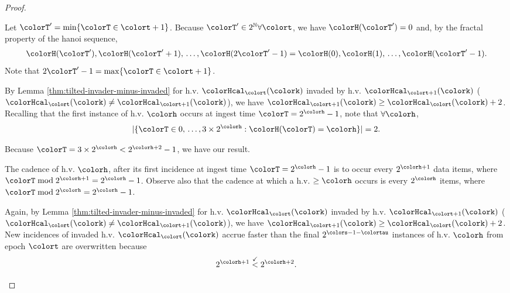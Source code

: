 \begin{proof}
\begin{proofpart}
Let $\colorT' = \min\{\colorT \in \colort + 1\}$.
Because $\colorT' \in 2^{\mathbb{N}} \forall \colort$, we have $\colorH(\colorT') = 0$ and, by the fractal property of the hanoi sequence,
\begin{align*}
\colorH(\colorT'), \colorH(\colorT'+1), \,\ldots, \colorH(2\colorT' - 1) = \colorH(0), \colorH(1), \,\ldots, \colorH(\colorT' - 1).
\end{align*}
Note that $2\colorT' - 1 = \max\{\colorT \in \colort + 1\}$.

By Lemma \ref{thm:tilted-invader-minus-invaded} for h.v. $\colorHcal_{\colort}(\colork)$ invaded by h.v. $\colorHcal_{\colort + 1}(\colork)$ ($\colorHcal_{\colort}(\colork) \neq \colorHcal_{\colort + 1}(\colork)$), we have $\colorHcal_{\colort + 1}(\colork) \geq \colorHcal_{\colort}(\colork) + 2$.
Recalling that the first instance of h.v. $\colorh$ occurs at ingest time $\colorT = 2^{\colorh} - 1$, note that $\forall\colorh$,
\begin{align*}
|\{\colorT \in 0,\,\ldots, 3 \times 2^{\colorh} : \colorH(\colorT) = \colorh\}| = 2.
\end{align*}
\end{proofpart}
Because $\colorT = 3 \times 2^{\colorh} < 2^{\colorh + 2} - 1$, we have our result.

\begin{proofpart}
The cadence of h.v. $\colorh$, after its first incidence at ingest time $\colorT=2^{\colorh} - 1$ is to occur every $2^{\colorh + 1}$ data items, where $\colorT \bmod 2^{\colorh + 1} = 2^{\colorh} - 1$.
Observe also that the cadence at which a h.v. $\geq\colorh$ occurs is every $2^{\colorh}$ items, where $\colorT \bmod 2^{\colorh} = 2^{\colorh} - 1$.

Again, by Lemma \ref{thm:tilted-invader-minus-invaded} for h.v. $\colorHcal_{\colort}(\colork)$ invaded by h.v. $\colorHcal_{\colort + 1}(\colork)$ ($\colorHcal_{\colort}(\colork) \neq \colorHcal_{\colort + 1}(\colork)$), we have $\colorHcal_{\colort + 1}(\colork) \geq \colorHcal_{\colort}(\colork) + 2$.
New incidences of invaded h.v. $\colorHcal_{\colort}(\colork)$ accrue faster than the final $2^{\colors - 1 - \colortau}$ instances of h.v. $\colorh$ from epoch $\colort$ are overwritten because
\begin{align*}
2^{\colorh + 1} \stackrel{\checkmark}{<} 2^{\colorh + 2}.
\end{align*}
\end{proofpart}

\end{proof}
